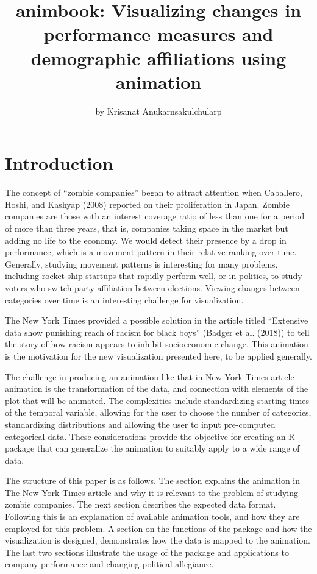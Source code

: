 \title{animbook: Visualizing changes in performance measures and demographic affiliations using animation}
\author{by Krisanat Anukarnsakulchularp}

\maketitle


\hypertarget{introduction}{%
\section{Introduction}\label{introduction}}

The concept of ``zombie companies'' began to attract attention when Caballero, Hoshi, and Kashyap (2008) reported on their proliferation in Japan. Zombie companies are those with an interest coverage ratio of less than one for a period of more than three years, that is, companies taking space in the market but adding no life to the economy. We would detect their presence by a drop in performance, which is a movement pattern in their relative ranking over time. Generally, studying movement patterns is interesting for many problems, including rocket ship startups that rapidly perform well, or in politics, to study voters who switch party affiliation between elections. Viewing changes between categories over time is an interesting challenge for visualization.

The New York Times provided a possible solution in the article titled ``Extensive data show punishing reach of racism for black boys'' (Badger et al. (2018)) to tell the story of how racism appears to inhibit socioeconomic change. This animation is the motivation for the new visualization presented here, to be applied generally.

The challenge in producing an animation like that in New York Times article animation is the transformation of the data, and connection with elements of the plot that will be animated. The complexities include standardizing starting times of the temporal variable, allowing for the user to choose the number of categories, standardizing distributions and allowing the user to input pre-computed categorical data. These considerations provide the objective for creating an R package that can generalize the animation to suitably apply to a wide range of data.

The structure of this paper is as follows. The section explains the animation in The New York Times article and why it is relevant to the problem of studying zombie companies. The next section describes the expected data format. Following this is an explanation of available animation tools, and how they are employed for this problem. A section on the functions of the package and how the visualization is designed, demonstrates how the data is mapped to the animation. The last two sections illustrate the usage of the package and applications to company performance and changing political allegiance.

